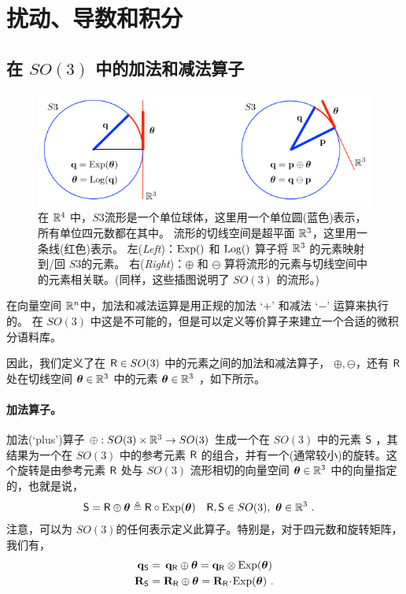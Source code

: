 \section{扰动、导数和积分}



\subsection{在 $SO(3)$ 中的加法和减法算子}

\begin{figure}[tb]
\centering
\includegraphics{figures/manifold}
\caption{在 ${\mathbb R}^4$ 中，$S3$流形是一个单位球体，这里用一个单位圆(蓝色)表示，所有单位四元数都在其中。
流形的切线空间是超平面 ${\mathbb R}^3$，这里用一条线(红色)表示。
左(\emph{Left})：$\operatorname*{Exp}()$ 和 $\operatorname*{Log}()$ 算子将 ${\mathbb R}^3$ 的元素映射到/回 $S3$的元素。
右(\emph{Right})：$\oplus$ 和 $\ominus$ 算将流形的元素与切线空间中的元素相关联。(同样，这些插图说明了 $SO(3)$ 的流形。)}
\label{fig:manifold}
\end{figure}

在向量空间 ${\mathbb R}^n$中，加法和减法运算是用正规的加法 `$+$' 和减法 `$-$' 运算来执行的。
在 $SO(3)$ 中这是不可能的，但是可以定义等价算子来建立一个合适的微积分语料库。 

因此，我们定义了在 $\mathsf R\in SO(3)$ 中的元素之间的加法和减法算子， $\oplus,\ominus$，还有 $\mathsf R$ 处在切线空间 ${\bm \theta}\in{\mathbb R}^3$ 中的元素 ${\bm \theta}\in{\mathbb R}^3$ ，如下所示。

\paragraph{加法算子。}
加法(`plus')算子 $\oplus:SO(3)\times{\mathbb R}^3\to SO(3)$ 生成一个在 $SO(3)$ 中的元素 $\mathsf S$ ，其结果为一个在 $SO(3)$ 中的参考元素 $\mathsf R$ 的组合，并有一个(通常较小)的旋转。这个旋转是由参考元素 $\mathsf R$ 处与 $SO(3)$ 流形相切的向量空间 ${\bm \theta}\in{\mathbb R}^3$ 中的向量指定的，也就是说，
%
\begin{align}
\mathsf S = \mathsf R\oplus {\bm \theta} &\triangleq \mathsf R\circ\operatorname*{Exp}({\bm \theta}) && \mathsf R,\mathsf S\in SO(3),~ {\bm \theta}\in{\mathbb R}^3 
~.
\end{align}
%
注意，可以为 $SO(3)$的任何表示定义此算子。特别是，对于四元数和旋转矩阵，我们有，
%
\begin{align}
{\bf q}_\mathsf S &= \,{\bf q}_\mathsf R\oplus{\bm \theta} = {\bf q}_\mathsf R\otimes\operatorname*{Exp}({\bm \theta}) \\
{\bf R}_\mathsf S &= {\bf R}_\mathsf R\oplus {\bm \theta} = {\bf R}_\mathsf R\!\cdot\!\operatorname*{Exp}({\bm \theta}) 
~.
\end{align}


